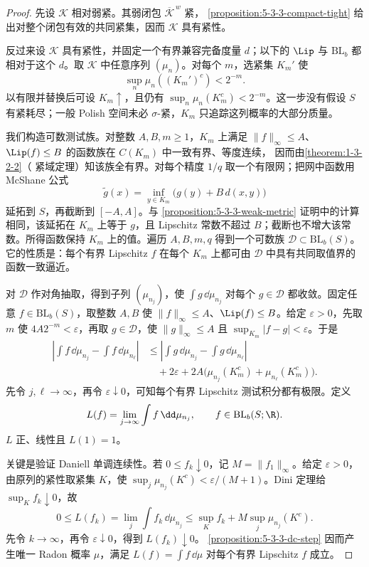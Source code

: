 \begin{proof}
先设 $\mathcal K$ 相对弱紧。其弱闭包 $\overline{\mathcal K}^{\,w}$ 紧，
\cref{proposition:5-3-3-compact-tight} 给出对整个闭包有效的共同紧集，因而
$\mathcal K$ 具有紧性。

反过来设 $\mathcal K$ 具有紧性，并固定一个有界兼容完备度量 $d$；以下的
$\Lip$ 与 $\mathrm{BL}_b$ 都相对于这个 $d$。取 $\mathcal K$ 中任意序列 $(\mu_n)$。对每个 $m$，选紧集
$K_m'$ 使
\[
 \sup_n\mu_n((K_m')^c)<2^{-m}.
\]
以有限并替换后可设 $K_m\uparrow$，且仍有
$\sup_n\mu_n(K_m^c)<2^{-m}$。这一步没有假设 $S$ 有紧耗尽；一般 Polish 空间未必
$\sigma$-紧，$K_m$ 只追踪这列概率的大部分质量。

我们构造可数测试族。对整数 $A,B,m\ge1$，$K_m$ 上满足
$\|f\|_\infty\le A$、$\Lip(f)\le B$ 的函数族在 $C(K_m)$ 中一致有界、等度连续，
因而由\cref{theorem:1-3-2-2}（\ArzelaAscoli{} 紧域定理）知该族全有界。对每个精度 $1/q$ 取一个有限网；把网中函数用
McShane 公式
\[
 \widetilde g(x)=\inf_{y\in K_m}\bigl(g(y)+B\,d(x,y)\bigr)
\]
延拓到 $S$，再截断到 $[-A,A]$。与
\cref{proposition:5-3-3-weak-metric} 证明中的计算相同，该延拓在
$K_m$ 上等于 $g$，且 Lipschitz 常数不超过 $B$；截断也不增大该常数。所得函数保持
$K_m$ 上的值。遍历 $A,B,m,q$ 得到一个可数族 $\mathcal D\subset\mathrm{BL}_b(S)$。
它的性质是：每个有界 Lipschitz $f$ 在每个 $K_m$ 上都可由
$\mathcal D$ 中具有共同取值界的函数一致逼近。

对 $\mathcal D$ 作对角抽取，得到子列 $(\mu_{n_j})$，使
$\int g\,\dd\mu_{n_j}$ 对每个 $g\in\mathcal D$ 都收敛。固定任意
$f\in\mathrm{BL}_b(S)$，取整数 $A,B$ 使
$\|f\|_\infty\le A$、$\Lip(f)\le B$。给定 $\varepsilon>0$，先取 $m$ 使
$4A2^{-m}<\varepsilon$，再取 $g\in\mathcal D$，使
$\|g\|_\infty\le A$ 且 $\sup_{K_m}|f-g|<\varepsilon$。于是
\[
\begin{aligned}
 \left|\int f\,\dd\mu_{n_j}-\int f\,\dd\mu_{n_\ell}\right|
 &\le
 \left|\int g\,\dd\mu_{n_j}-\int g\,\dd\mu_{n_\ell}\right|\\
 &\quad+2\varepsilon
   +2A\bigl(\mu_{n_j}(K_m^c)+\mu_{n_\ell}(K_m^c)\bigr).
\end{aligned}
\]
先令 $j,\ell\to\infty$，再令 $\varepsilon\downarrow0$，可知每个有界 Lipschitz
测试积分都有极限。定义
\[
 L(f)=\lim_{j\to\infty}\int f\,\dd\mu_{n_j},
 \qquad f\in\mathrm{BL}_b(S;\R).
\]
$L$ 正、线性且 $L(1)=1$。

关键是验证 Daniell 单调连续性。若 $0\le f_k\downarrow0$，记
$M=\|f_1\|_\infty$。给定 $\varepsilon>0$，由原列的紧性取紧集 $K$，使
$\sup_j\mu_{n_j}(K^c)<\varepsilon/(M+1)$。Dini 定理给
$\sup_K f_k\downarrow0$，故
\[
 0\le L(f_k)
 =\lim_j\int f_k\,\dd\mu_{n_j}
 \le \sup_K f_k+M\sup_j\mu_{n_j}(K^c).
\]
先令 $k\to\infty$，再令 $\varepsilon\downarrow0$，得到 $L(f_k)\downarrow0$。
\cref{proposition:5-3-3-dc-step} 因而产生唯一 Radon 概率 $\mu$，满足
$L(f)=\int f\,\dd\mu$ 对每个有界 Lipschitz $f$ 成立。


\end{proof}
